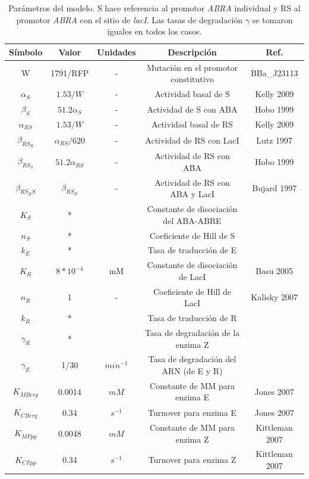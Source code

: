 \documentclass[12pt]{article}
\begin{document}
\begin{table}[H]
\centering
\begin{tabular}{c c c c c} 
 \hline
 S\'imbolo & Valor & Unidades & Descripci\'on & Ref. \\
 \hline\hline
 W & 1791/RFP & - & Mutaci\'on en el promotor constitutivo & BBa\_J23113 \\
 $\alpha_S$ & $1.53/W$ & - & Actividad basal de S & Kelly  2009  \\ 
 $\beta_S$ & $51.2 \alpha_S$ & - &  Actividad de S con ABA & Hobo 1999 \\
 $\alpha_{RS}$ & $1.53/W$ & - & Actividad basal de RS & Kelly  2009\\
 $\beta_{RS_R}$ & $\alpha_{RS}/620$ & - & Actividad de RS con LacI & Lutz 1997\\
 $\beta_{RS_S}$ & $51.2 \alpha_{RS}$ & - & Actividad de  RS con ABA & Hobo 1999\\
 $\beta_{RS_RS}$ & $\beta_{RS_R}$ & - & Actividad de RS con ABA y LacI & Bujard 1997 \\
 $K_S$ & * &  & Constante de disociaci\'on del ABA-ABRE &  \\
 $n_S$ & * &  & Coeficiente de Hill de S & \\
 $k_E$ & * &  & Tasa de traducci\'on de E &   \\
 $K_R$ & $8*10^{-4}$ & mM & Constante de disociaci\'on de LacI & Basu 2005\\
 $n_R$ & 1 & - & Coeficiente de Hill de LacI & Kalisky 2007\\
 $k_R$ & * & & Tasa de traducci\'on de R & \\
 $\gamma_R$ & * & & Tasa de degradaci\'on de la enzima Z & \\
 $\gamma_E$ & 1/30 & $min^{-1}$ & Tasa de degradaci\'on del ARN (de E y R) & \\
 $K_{MBerg}$ & 0.0014 & $mM$ & Constante de MM para enzima E & Jones 2007 \\
 $K_{CBerg}$ & 0.34 & $s^{-1}$ & Turnover para enzima E & Jones 2007 \\
 $K_{MFpp}$ & 0.0048 & $mM$ & Constante de MM para enzima Z & Kittleman 2007 \\
 $K_{CFpp}$ & 0.34 & $s^{-1}$ & Turnover para enzima Z & Kittleman 2007 \\
 \hline
\end{tabular}
\caption{Par\'ametros del modelo. S hace referencia al promotor \emph{ABRA} individual y RS al promotor \emph{ABRA} con el sitio de \emph{lacI}. Las tasas de degradaci\'on $\gamma$ se tomaron iguales en todos los casos.}
\label{tab:1}
\end{table}
\end{document}
